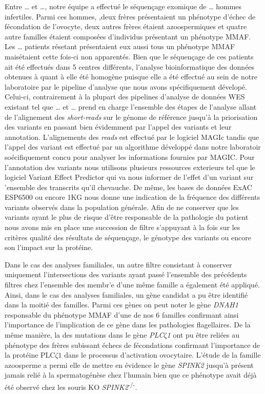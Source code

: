 \documentclass[12pt,twoside]{reedthesis}
\theoremstyle{definition}
\theoremstyle{definition}
\theoremstyle{remark}
\begin{document}
  Entre \ldots{} et \ldots{}, notre équipe a effectué le séquençage
  exomique de \ldots{} hommes infertiles. Parmi ces hommes, ,deux frères
  présentaient un phénotype d'échec de fécondation de l'ovocyte, deux
  autres frères étaient azoospermiques et quatre autre familles étaient
  composées d'individus présentant un phénotype MMAF. Les \ldots{}
  patients résetant présentaient eux aussi tous un phénotype MMAF
  maisétaient cette fois-ci non apparentés. Bien que le séquençage de ces
  patients ait été effectués dans 5 centres différents, l'analyse
  bioinformatique des données obtenues à quant à elle été homogène puisque
  elle a été effectué au sein de notre laboratoire par le pipeline
  d'analyse que nous avons spécifiquement dévelopé. Celui-ci,
  contrairement à la plupart des pipelines d'analyse de données WES
  existant tel que \ldots{} et \ldots{} prend en charge l'ensemble des
  étapes de l'analyse allant de l'alignement des \emph{short-reads} sur le
  génome de référence jusqu'à la priorisation des variants en passant bien
  évidemment par l'appel des variants et leur annotation. L'alignements
  des \emph{reads} est effectué par le logiciel MAGIc tandis que l'appel
  des variant est effectué par un algorithme développé dans notre
  laboratoir soécifiquement concu pour analyser les informations fournies
  par MAGIC. Pour l'annotation des variants nous utilisons plusieurs
  ressources exterieurs tel que le logiciel Variant Effect Predictor qui
  va nous informer de l'effet d'un variant sur 'ensemble des transcrits
  qu'il chevauche. De même, les bases de données ExAC ESP6500 ou encore
  1KG nous donne une indication de la fréquence des différents variants
  observés dans la population générale. Afin de ne conserver que les
  variants ayant le plus de risque d'être responsable de la pathologie du
  patient nous avons mis en place une succession de filtre s'appuyant à la
  fois sur les critères qualité des résultats de séquençage, le génotype
  des variants ou encore son l'impact sur la protéine.
  
  Dans le cas des analyses familiales, un autre filtre consistant à
  conserver uniquement l'intersections des variants ayant passé l'ensemble
  des précédents filtres chez l'ensemble des membr'e d'une même famille a
  également été appliqué. Ainsi, dans le cas des analyses familiales, un
  gène candidat a pu être identifié dans la moitié des familles. Parmi ces
  gènes on peut noter le gène \emph{DNAH1} responsable du phénotype MMAF
  d'une de nos 6 familles confirmant ainsi l'importance de l'implication
  de ce gène dans les pathologies flagellaires. De la même manière, la des
  mutations dans le gène \emph{PLC}\(\zeta\)\emph{1} ont pu être reliées
  au phénotype des frères subissant échecs de fécondations confirmant
  l'importance de la protéine PLC\(\zeta 1\) dans le processus
  d'activation ovocytaire. L'étude de la famille azoosperme a permi elle
  de mettre en évidence le gène \emph{SPINK2} jusqu'à présent jamais relié
  à la spermatogénèse chez l'humain bien que ce phénotype avait déjà été
  observé chez les souris KO \emph{SPINK2}\textsuperscript{-/-}.
  
\end{document}
